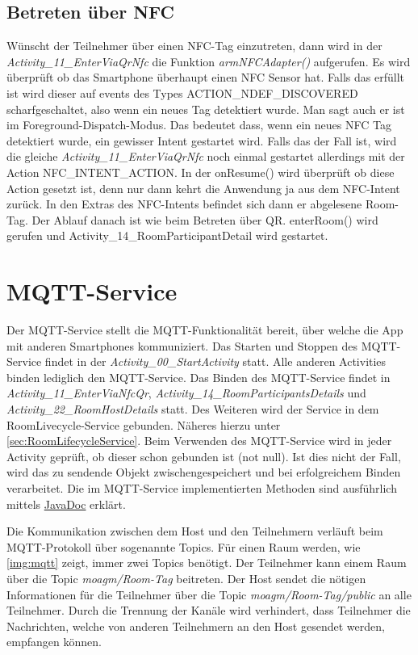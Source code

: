 \subsection{Betreten über NFC}
\label{subsec: Betreten über NFC}
Wünscht der Teilnehmer über einen NFC-Tag einzutreten, dann wird in der \textit{Activity\_11\_EnterViaQrNfc} die Funktion \textit{armNFCAdapter()} aufgerufen. Es wird überprüft ob das Smartphone überhaupt einen NFC Sensor hat.
Falls das erfüllt ist wird dieser auf events des Types ACTION\_NDEF\_DISCOVERED scharfgeschaltet, also wenn ein neues Tag detektiert wurde.
Man sagt auch er ist im Foreground-Dispatch-Modus.
Das bedeutet dass, wenn ein neues NFC Tag detektiert wurde, ein gewisser Intent gestartet wird. 
Falls das der Fall ist, wird die gleiche \textit{Activity\_11\_EnterViaQrNfc} noch einmal gestartet allerdings mit der Action NFC\_INTENT\_ACTION. 
In der onResume() wird überprüft ob diese Action gesetzt ist, denn nur dann kehrt die Anwendung ja aus dem NFC-Intent zurück. 
In den Extras des NFC-Intents befindet sich dann er abgelesene Room-Tag. Der Ablauf danach ist wie beim Betreten über QR. enterRoom() wird gerufen und Activity\_14\_RoomParticipantDetail wird gestartet.
\section{MQTT-Service}
Der MQTT-Service stellt die MQTT-Funktionalität bereit, über welche die App mit anderen Smartphones kommuniziert.
Das Starten und Stoppen des MQTT-Service findet in der \textit{Activity\_00\_StartActivity} statt. Alle anderen Activities binden lediglich den MQTT-Service. Das Binden des MQTT-Service findet in  \textit{Activity\_11\_EnterViaNfcQr}, \textit{Activity\_14\_RoomParticipantsDetails} und \textit{Activity\_22\_RoomHostDetails} statt. Des Weiteren wird der Service in dem RoomLivecycle-Service gebunden. Näheres hierzu unter \cref{sec:RoomLifecycleService}.  Beim Verwenden des MQTT-Service wird in jeder Activity geprüft, ob dieser schon gebunden ist (not null). Ist dies nicht der Fall, wird das zu sendende Objekt zwischengespeichert und bei erfolgreichem Binden verarbeitet. 
Die im MQTT-Service implementierten Methoden sind ausführlich mittels \href{https://scm.inftech.hs-mannheim.de/gogs/moa/20moagm/src/dev/Doku/javadoc}{JavaDoc} erklärt. 

Die Kommunikation zwischen dem Host und den Teilnehmern verläuft beim MQTT-Protokoll über sogenannte Topics. Für einen Raum werden, wie \cref{img:mqtt} zeigt, immer zwei Topics benötigt. Der Teilnehmer kann einem Raum über die Topic \textit{moagm/Room-Tag} beitreten. Der Host sendet die nötigen Informationen für die Teilnehmer über die Topic \textit{moagm/Room-Tag/public} an alle Teilnehmer. Durch die Trennung der Kanäle wird verhindert, dass Teilnehmer die Nachrichten, welche von anderen Teilnehmern an den Host gesendet werden, empfangen können.

